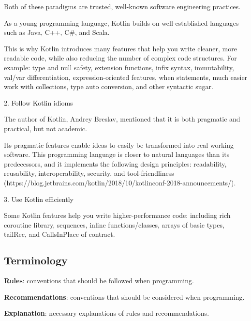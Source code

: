     Both of these paradigms are trusted, well-known software engineering practices.

    As a young programming language, Kotlin builds on well-established languages such as Java, C++, C\#, and Scala.

    This is why Kotlin introduces many features that help you write cleaner, more readable code, while also reducing the number of complex code structures. For example: type and null safety, extension functions, infix syntax, immutability, val/var differentiation, expression-oriented features, when statements, much easier work with collections, type auto conversion, and other syntactic sugar.



2. Follow Kotlin idioms



    The author of Kotlin, Andrey Breslav, mentioned that it is both pragmatic and practical, but not academic.

    Its pragmatic features enable ideas to easily be transformed into real working software. This programming language is closer to natural languages than its predecessors, and it implements the following design principles: readability, reusability, interoperability, security, and tool-friendliness (https://blog.jetbrains.com/kotlin/2018/10/kotlinconf-2018-announcements/).



3. Use Kotlin efficiently



    Some Kotlin features help you write higher-performance code: including rich coroutine library, sequences, inline functions/classes, arrays of basic types, tailRec, and CallsInPlace of contract.



\subsection*{\textbf{Terminology}}



\textbf{Rules}: conventions that should be followed when programming.



\textbf{Recommendations}: conventions that should be considered when programming.



\textbf{Explanation}: necessary explanations of rules and recommendations.



